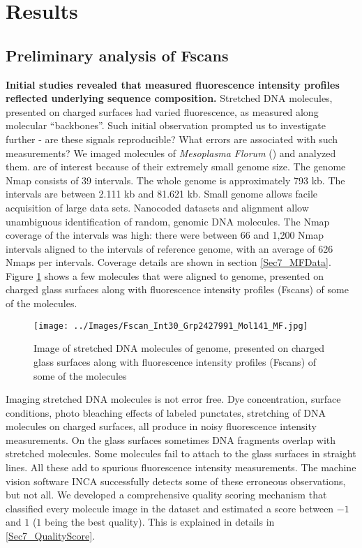 \section{Results} \label{Results}
\subsection{Preliminary analysis of \mf Fscans} \label{Sec2_Mflorum}
{\bf{Initial studies revealed that measured fluorescence intensity profiles reflected underlying sequence composition.}} Stretched DNA molecules, presented on charged surfaces had varied fluorescence, as measured along molecular ``backbones''. Such initial observation prompted us to investigate further - are these signals reproducible? What errors are associated with such measurements? We imaged molecules of {\emph{Mesoplasma Florum}} (\mf) and analyzed them. \mf are of interest because of their extremely small genome size. The \mf genome Nmap consists of 39 intervals. The whole genome is approximately 793 kb. The intervals are between 2.111 kb and 81.621 kb. Small genome allows facile acquisition of large data sets.  Nanocoded datasets and alignment allow unambiguous identification of random, genomic DNA molecules. The Nmap coverage of the intervals was high: there were between 66 and 1,200 Nmap intervals aligned to the intervals of \mf reference genome, with an average of 626 Nmaps per intervals. Coverage details are shown in section \ref{Sec7_MFData}. Figure \ref{fig:Sec2_Fscan} shows a few molecules that were aligned to \mf genome, presented on charged glass surfaces along with fluorescence intensity profiles (Fscans) of some of the molecules. 

\begin{figure}[H]
\centering
\texttt{[image: ../Images/Fscan\_Int30\_Grp2427991\_Mol141\_MF.jpg]}
\caption{Image of stretched DNA molecules of \mf genome, presented on charged glass surfaces along with fluorescence intensity profiles (Fscans) of some of the molecules}
\label{fig:Sec2_Fscan}
\end{figure}

Imaging stretched DNA molecules is not error free. Dye concentration, surface conditions, photo bleaching effects of labeled punctates, stretching of DNA molecules on charged surfaces, all produce in noisy fluorescence intensity measurements. On the glass surfaces sometimes DNA fragments overlap with stretched molecules. Some molecules fail to attach to the glass surfaces in straight lines. All these add to spurious fluorescence intensity measurements. The machine vision software INCA successfully detects some of these erroneous observations, but not all. We developed a comprehensive quality scoring mechanism that classified every molecule image in the dataset and estimated a score between $-1$ and $1$ ($1$ being the best quality). This is explained in details in \ref{Sec7_QualityScore}. 

